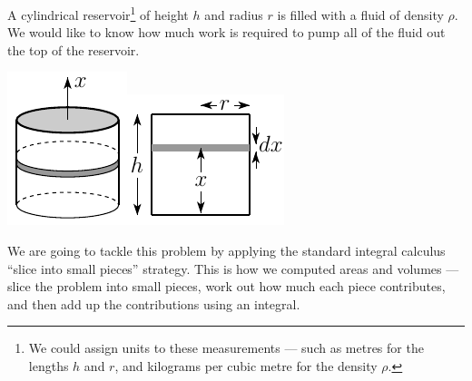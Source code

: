 \begin{eg}\label{eg:WKdrum}
A cylindrical reservoir\footnote{We could assign units to these measurements --- such as
metres for the lengths $h$ and $r$, and kilograms per cubic metre for the density $\rho$.}
of height $h$ and radius $r$ is filled with a fluid
of density $\rho$. We would like to know how much work is required to pump all of
the fluid out the top of the reservoir.
\begin{efig}
\begin{center}
   \includegraphics{drum}\qquad\qquad\includegraphics{drumX}
\end{center}
\end{efig}

\soln We are going to tackle this problem by applying the standard
integral calculus ``slice into small pieces'' strategy. This is how we computed areas and
volumes --- slice the problem into small pieces, work out how much each piece contributes,
and then add up the contributions using an integral.


\end{eg}
